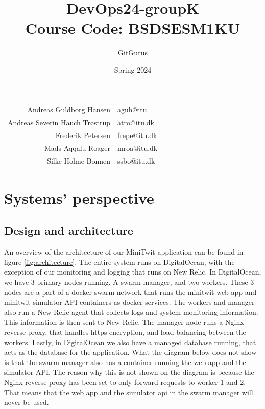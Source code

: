 \documentclass{article}
\title{DevOps24-groupK\\
\large Course Code: BSDSESM1KU}
\author{GitGurus}
\date{Spring 2024}
\begin{document}
\maketitle

\begin{table}[H]
    \centering
    \begin{tabular}{r|l}
    Andreas Guldborg Hansen & aguh@itu \\
    Andreas Severin Hauch Trøstrup & atro@itu.dk \\
    Frederik Petersen & frepe@itu.dk \\
    Mads Aqqalu Roager & mroa@itu.dk \\
    Silke Holme Bonnen & ssbo@itu.dk
    \end{tabular}
\end{table}

\newpage
\tableofcontents

\newpage


\section{Systems' perspective}
\subsection{Design and architecture}
An overview of the architecture of our MiniTwit application can be found in figure \ref{fig:architecture}. 
The entire system runs on DigitalOcean, with the exception of our monitoring and logging that runs on New Relic.
In DigitalOcean, we have 3 primary nodes running. A swarm manager, and two workers. These 3 nodes are a part of a docker swarm network that runs the minitwit web app and minitwit simulator API containers as docker services.
The workers and manager also run a New Relic agent that collects logs and system monitoring information. This information is then sent to New Relic.
The manager node runs a Nginx reverse proxy, that handles https encryption, and load balancing between the workers.
Lastly, in DigitalOcean we also have a managed database running, that acts as the database for the application.
What the diagram below does not show is that the swarm manager also has a container running the web app and the simulator API. The reason why this is not shown on the diagram is because the Nginx reverse proxy has been set to only forward requests to worker 1 and 2. 
That means that the web app and the simulator api in the swarm manager will never be used. 
\end{document}
